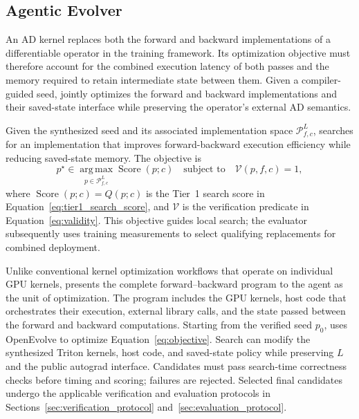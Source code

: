 \subsection{Agentic Evolver}
\label{sec:evolution}

An AD kernel replaces both the forward and backward implementations of a differentiable operator in the training framework. Its optimization objective must therefore account for the combined execution latency of both passes and the memory required to retain intermediate state between them. Given a compiler-guided seed, \method jointly optimizes the forward and backward implementations and their saved-state interface while preserving the operator's external AD semantics.

Given the synthesized seed and its associated implementation space $\mathcal{P}_{f,c}^{L}$, \method searches for an implementation that improves forward-backward execution efficiency while reducing saved-state memory. The objective is
\begin{equation}
    p^\star
    \in
    \operatorname*{arg\,max}_{p\in\mathcal{P}_{f,c}^{L}}
    \operatorname{Score}(p;c)
    \quad \text{subject to} \quad
    \mathcal{V}(p,f,c)=1,
    \label{eq:objective}
\end{equation}
where $\operatorname{Score}(p;c)=Q(p;c)$ is the Tier~1 search score in Equation~\ref{eq:tier1_search_score}, and $\mathcal{V}$ is the verification predicate in Equation~\ref{eq:validity}. This objective guides local search; the evaluator subsequently uses training measurements to select qualifying replacements for combined deployment.

Unlike conventional kernel optimization workflows that operate on individual GPU kernels, \method presents the complete forward--backward program to the agent as the unit of optimization. The program includes the GPU kernels, host code that orchestrates their execution, external library calls, and the state passed between the forward and backward computations.
Starting from the verified seed $p_0$, \method uses OpenEvolve to optimize Equation~\ref{eq:objective}. Search can modify the synthesized Triton kernels, host code, and saved-state policy while preserving $L$ and the public autograd interface. Candidates must pass search-time correctness checks before timing and scoring; failures are rejected. Selected final candidates undergo the applicable verification and evaluation protocols in Sections~\ref{sec:verification_protocol} and~\ref{sec:evaluation_protocol}.

